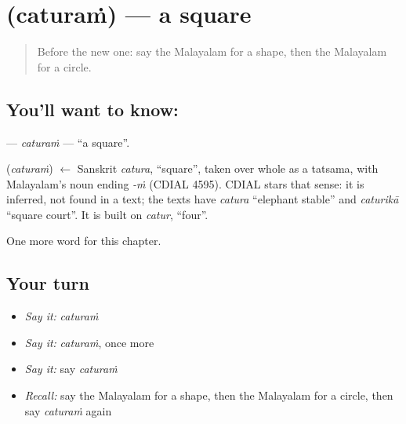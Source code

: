 \section[\texorpdfstring{\ml{ചതുരം} (caturaṁ)}{ചതുരം (caturaṁ)}]{ (caturaṁ) — a square}

\label{lesson:ML-C258-caturam}



\begin{quote}
Before the new one: say the Malayalam for a shape, then the Malayalam for a circle.
\end{quote}

\subsection*{You'll want to know: }
\textbf{} — \emph{caturaṁ} — \textquotedblleft{}a square\textquotedblright{}.

\begin{cousinweb}
\textbf{} (\emph{caturaṁ}) $\leftarrow$ Sanskrit \emph{catura}, \textquotedblleft{}square\textquotedblright{}, taken over whole as a tatsama, with Malayalam's noun ending \emph{-ṁ} (CDIAL 4595). CDIAL stars that sense: it is inferred, not found in a text; the texts have \emph{catura} \textquotedblleft{}elephant stable\textquotedblright{} and \emph{caturikā} \textquotedblleft{}square court\textquotedblright{}. It is built on \emph{catur}, \textquotedblleft{}four\textquotedblright{}.
\end{cousinweb}

\begin{grammarlens}[title={What you've built}]
One more word for this chapter.
\end{grammarlens}

\subsection*{Your turn}
\begin{itemize}
\raggedright
  \item \emph{Say it:} \emph{caturaṁ}
  \item \emph{Say it:} \emph{caturaṁ}, once more
  \item \emph{Say it:} say \emph{caturaṁ}
  \item \emph{Recall:} say the Malayalam for a shape, then the Malayalam for a circle, then say \emph{caturaṁ} again
\end{itemize}

